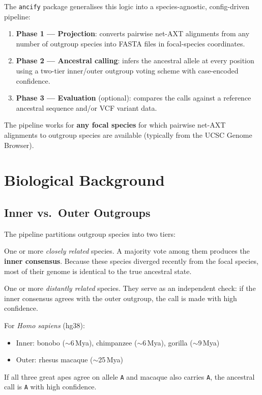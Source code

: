 \documentclass[11pt,a4paper]{article}
\begin{document}
The \texttt{ancify} package generalises this logic into a species-agnostic, config-driven pipeline:

\begin{enumerate}[leftmargin=2em]
    \item \textbf{Phase 1 --- Projection}: converts pairwise net-AXT alignments from any number of outgroup species into FASTA files in focal-species coordinates.
    \item \textbf{Phase 2 --- Ancestral calling}: infers the ancestral allele at every position using a two-tier inner/outer outgroup voting scheme with case-encoded confidence.
    \item \textbf{Phase 3 --- Evaluation} (optional): compares the calls against a reference ancestral sequence and/or VCF variant data.
\end{enumerate}

The pipeline works for \textbf{any focal species} for which pairwise net-AXT alignments to outgroup species are available (typically from the UCSC Genome Browser).


\section{Biological Background}
\label{sec:background}

\subsection{Inner vs.\ Outer Outgroups}

The pipeline partitions outgroup species into two tiers:

\begin{description}[leftmargin=2em, labelwidth=3.5cm]
    \item[Inner outgroup] One or more \emph{closely related} species.  A majority vote among them produces the \textbf{inner consensus}.  Because these species diverged recently from the focal species, most of their genome is identical to the true ancestral state.
    \item[Outer outgroup] One or more \emph{distantly related} species.  They serve as an independent check: if the inner consensus agrees with the outer outgroup, the call is made with high confidence.
\end{description}

\begin{conceptbox}
For \textit{Homo sapiens} (hg38):
\begin{itemize}
    \item Inner: bonobo ($\sim$6\,Mya), chimpanzee ($\sim$6\,Mya), gorilla ($\sim$9\,Mya)
    \item Outer: rhesus macaque ($\sim$25\,Mya)
\end{itemize}
If all three great apes agree on allele \texttt{A} and macaque also carries \texttt{A}, the ancestral call is \texttt{A} with high confidence.
\end{conceptbox}
\end{document}
